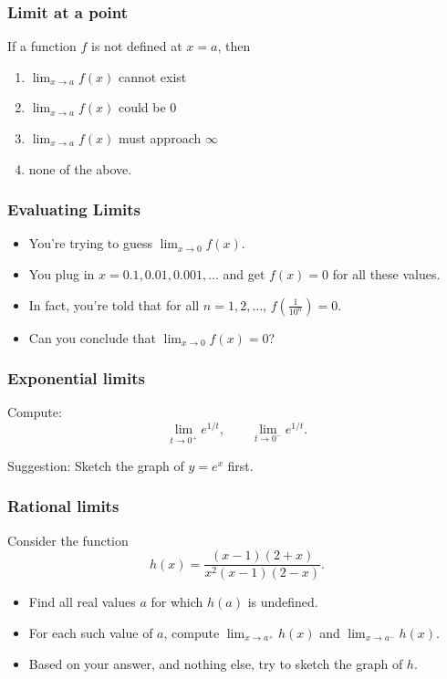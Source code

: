 \begin{frame}
	\frametitle{Limit at a point}

	If a function $f$ is not defined at $x=a$, then
	\begin{enumerate}
		\item $\displaystyle{\lim_{x\rightarrow a} f(x)}$ cannot exist

		\item $\displaystyle{\lim_{x\rightarrow a} f(x)}$ could be $0$

		\item $\displaystyle{\lim_{x\rightarrow a} f(x)}$ must approach $\infty$

		\item none of the above.
	\end{enumerate}
\end{frame}

\begin{frame}
	\frametitle{Evaluating Limits}

	\begin{itemize}
		\item You're trying to guess $\displaystyle{\lim_{x \rightarrow 0} f(x)}$.

		\item You plug in $x=0.1, 0.01, 0.001, \dots$ and get $f(x)=0$ for all these
			values.

		\item In fact, you're told that for all $n=1, 2, \dots$, $\displaystyle{f\left(\frac{1}{10^{n}}\right)}
			=0$. \\

		\item Can you conclude that $\displaystyle \lim_{x \rightarrow 0}f(x)=0$?
	\end{itemize}
\end{frame}

\begin{frame}
	\frametitle{Exponential limits}

	Compute:
	\[
		\lim_{t \to 0^+}e^{1/t}, \quad \quad \lim_{t \to 0^-}e^{1/t}.
	\]

	Suggestion: Sketch the graph of $\displaystyle y=e^{x}$ first.
\end{frame}

\begin{frame}[t]
	\frametitle{Rational limits}

	Consider the function
	\[
		h(x) = \frac{(x-1)(2+x)}{x^{2}(x-1)(2-x)}.
	\]
	\begin{itemize}
		\item Find all real values $a$ for which $h(a)$ is undefined. \\

		\item For each such value of $a$, compute
			$\displaystyle \lim_{x \to a^+}h(x)$ and
			$\displaystyle \lim_{x \to a^-}h(x)$. \\

		\item Based on your answer, and nothing else, try to sketch the graph of $h$.
	\end{itemize}
\end{frame}

